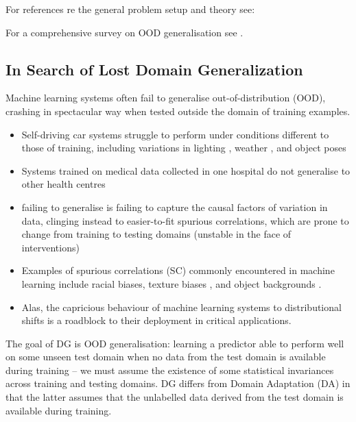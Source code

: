 For references re the general problem setup and theory see:
\citet{gulrajani2020search, krueger2021out, arjovskyinvariant, ahuja2020invariant,
weber2022certifying, rosenfeld2020risks}

For a comprehensive survey on OOD generalisation see  \citet{shen2021towards}.

\subsection{In Search of Lost Domain Generalization \citep{gulrajani2020search}}
Machine learning systems often fail to generalise out-of-distribution (OOD), crashing in 
spectacular way when tested outside the domain of training examples.

\itemi\begin{itemize}
  \item Self-driving car systems struggle to perform under conditions different to those of 
    training, including variations in lighting \citep{dai2018dark}, weather \citep{volk2019towards}, 
    and object poses \citep{alcorn2019strike}
  \item Systems trained on medical data collected in one hospital do not generalise to other health
    centres \citep{castro2020causality, albadawy2018deep}
  \item failing to generalise is failing to capture the causal factors of variation in data, 
    clinging instead to easier-to-fit spurious correlations, which are prone to change from 
    training to testing domains (unstable in the face of interventions)
  \item  Examples of spurious correlations (SC) commonly encountered in machine learning include 
    racial biases, texture biases \citep{geirhos2018imagenet}, and object backgrounds
    \citep{beery2018recognition} .
  \item Alas, the capricious behaviour of machine learning systems to distributional shifts is a 
    roadblock to their deployment in critical applications.
\end{itemize}

The goal of DG is OOD generalisation: learning a predictor able to perform well on some unseen test
domain when no data from the test domain is available during training -- we must assume the 
existence of some statistical invariances across training and testing domains.
DG differs from Domain Adaptation (DA) in that the latter assumes that the unlabelled data derived 
from the test domain is available during training.


